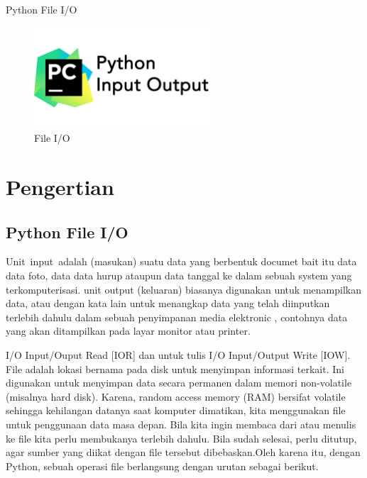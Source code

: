 
\sloppy
\begin{center}{\fontsize{16pt}{16pt}\selectfont Python File I/O \\}\end{center} \par


\begin{figure}[ht]
	\centerline{\includegraphics[width=0.60\textwidth]{Gambar/dapi7.jpg}}
	\caption{File I/O}
	\label{File I/O}
\end{figure}



\section {Pengertian }
\subsection {Python File I/O}

Unit~input~adalah (masukan) suatu  data yang berbentuk documet bait itu data data foto, data data hurup ataupun data tanggal ke dalam sebuah system yang  terkomputerisasi.  unit output (keluaran) biasanya digunakan untuk menampilkan data, atau dengan kata lain untuk menangkap data yang telah diinputkan terlebih dahulu dalam sebuah penyimpanan media elektronic , contohnya data yang akan ditampilkan pada layar monitor atau printer. \par
I/O Input/Ouput Read [IOR] dan untuk tulis I/O Input/Output Write [IOW]. File adalah lokasi bernama pada disk untuk menyimpan informasi terkait. Ini digunakan untuk menyimpan data secara permanen dalam memori non-volatile (misalnya hard disk). Karena, random access memory (RAM) bersifat volatile sehingga kehilangan datanya saat komputer dimatikan, kita menggunakan file untuk penggunaan data masa depan. Bila kita ingin membaca dari atau menulis ke file kita perlu membukanya terlebih dahulu. Bila sudah selesai, perlu ditutup, agar sumber yang diikat dengan file tersebut dibebaskan.Oleh karena itu, dengan Python, sebuah operasi file berlangsung dengan urutan sebagai berikut. \par
\vspace{12pt}
\noindent 

